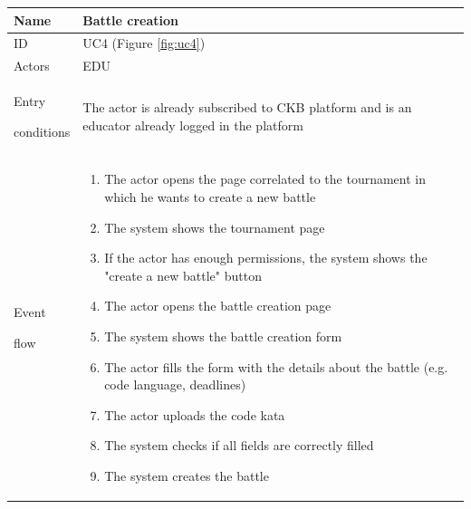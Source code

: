 \begin{center}
    \def\arraystretch{1.5}
    \begin{tabular}{| m{2cm} | m{10cm}|}
        \hline
        Name                  & Battle creation                                                                                                                                                               \\ \hline
        ID                    & UC4 (Figure \ref{fig:uc4})                                                                                                                                                    \\ \hline
        Actors                & EDU                                                                                                                                                                           \\ \hline
        Entry \par conditions & The actor is already subscribed to CKB platform and is an educator already logged in the platform                                                                             \\ \hline
        Event \par flow       & \begin{enumerate}
                                    \item The actor opens the page correlated to the tournament in which he wants to create a new battle
                                    \item The system shows the tournament page
                                    \item If the actor has enough permissions, the system shows the "create a new battle" button
                                    \item The actor opens the battle creation page
                                    \item The system shows the battle creation form
                                    \item The actor fills the form with the details about the battle (e.g. code language, deadlines)
                                    \item The actor uploads the code kata
                                    \item The system checks if all fields are correctly filled
                                    \item The system creates the battle

\end{enumerate}
\end{tabular}
\end{center}
